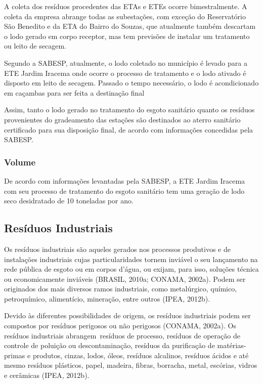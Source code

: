 	A coleta dos resíduos procedentes das ETAs e ETEs ocorre bimestralmente. A coleta da empresa abrange todas as subestações, com exceção do Reservatório São Benedito e da ETA do Bairro do Souzas, que atualmente também descartam o lodo gerado em corpo receptor, mas tem previsões de instalar um tratamento ou leito de secagem.
	
	Segundo a SABESP, atualmente, o lodo coletado no município é levado para a ETE Jardim Iracema onde ocorre o processo de tratamento e o lodo ativado é disposto em leito de secagem. Passado o tempo necessário, o lodo é acondicionado em caçambas para ser feita a destinação final
	
	Assim, tanto o lodo gerado no tratamento do esgoto sanitário quanto os resíduos provenientes do gradeamento das estações são destinados ao aterro sanitário certificado para sua disposição final, de acordo com informações concedidas pela SABESP. 
	
	\subsubsection{Volume}
	De acordo com informações levantadas pela SABESP, a ETE Jardim Iracema com seu processo de tratamento do esgoto sanitário tem uma geração de lodo seco desidratado de 10 toneladas por ano.
	
	\subsection{Resíduos Industriais}
	
	Os resíduos industriais são aqueles gerados nos processos produtivos e de instalações industriais cujas particularidades tornem inviável o seu lançamento na rede pública de esgoto ou em corpos d’água, ou exijam, para isso, soluções técnica ou economicamente inviáveis (BRASIL, 2010a; CONAMA, 2002a). Podem ser originados dos mais diversos ramos industriais, como metalúrgico, químico, petroquímico, alimentício, mineração, entre outros (IPEA, 2012b).
	
	Devido às diferentes possibilidades de origem, os resíduos industriais podem ser compostos por resíduos perigosos ou não perigosos (CONAMA, 2002a). Os resíduos industriais abrangem resíduos de processo, resíduos de operação de controle de poluição ou descontaminação, resíduos da purificação de matérias-primas e produtos, cinzas, lodos, óleos, resíduos alcalinos, resíduos ácidos e até mesmo resíduos plásticos, papel, madeira, fibras, borracha, metal, escórias, vidros e cerâmicas (IPEA, 2012b).
	
